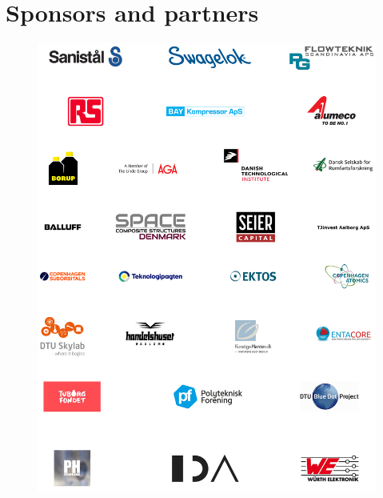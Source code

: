 \chapter{Sponsors and partners}
\begin{figure}[h]
    \hspace{-0.5cm}
	\includegraphics[scale=0.27]{figures/sponsors.png}
\end{figure}